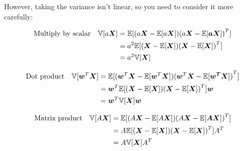 \documentclass[../../main.tex]{subfiles}
\begin{document}
However, taking the variance isn't linear, so you need to consider it more carefully:

\begin{align*}
\textrm{Multiply by scalar}\quad \mathbb{V}[a\bm{X}]
&=
\mathbb{E}[(a\bm{X} - \mathbb{E}[a\bm{X}]){(a\bm{X} - \mathbb{E}[\bm{aX}])}^T] \\
&=
a^2\mathbb{E}[(\bm{X} - \mathbb{E}[\bm{X}]){(\bm{X} - \mathbb{E}[\bm{X}])}^T] \\
&=
a^2\mathbb{V}[\bm{X}]
\end{align*}

\begin{align*}
\textrm{Dot product}\quad \mathbb{V}[\bm{w}^T\bm{X}]
&=
\mathbb{E}[(\bm{w}^T\bm{X} - \mathbb{E}[\bm{w}^T\bm{X}]){(\bm{w}^T \bm{X} - \mathbb{E}[\bm{\bm{w}^T X}])}^T] \\
&=
\bm{w}^T\mathbb{E}[(\bm{X} - \mathbb{E}[\bm{X}]){(\bm{X} - \mathbb{E}[\bm{X}])}^T]\bm{w} \\
&=
\bm{w}^T\mathbb{V}[\bm{X}]\bm{w}
\end{align*}

\begin{align*}
\textrm{Matrix product}\quad \mathbb{V}[A\bm{X}]
&=
\mathbb{E}[(A\bm{X} - \mathbb{E}[A\bm{X}]){(A\bm{X} - \mathbb{E}[\bm{AX}])}^T] \\
&=
A\mathbb{E}[(\bm{X} - \mathbb{E}[\bm{X}]){(\bm{X} - \mathbb{E}[\bm{X}])}^T]A^T \\
&=
A\mathbb{V}[\bm{X}]A^T
\end{align*}
\end{document}
